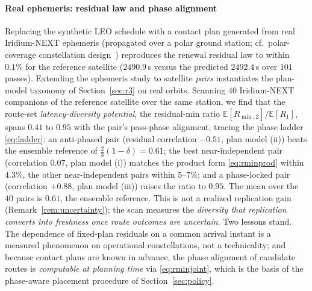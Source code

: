 \documentclass[twocolumn,3p,times,procedia]{elsarticle}
\theoremstyle{plain}
\theoremstyle{remark}
\newcommand{\E}{\mathbb{E}}
\begin{document}
\paragraph*{Real ephemeris: residual law and phase alignment}
Replacing the synthetic LEO schedule with a contact plan generated from
real Iridium-NEXT ephemeris (propagated over a polar ground station;
cf.\ polar-coverage constellation design~\cite{ma2026igso}) reproduces
the renewal residual law to within $0.1\%$ for the reference satellite
($2490.9$\,s versus the predicted $2492.4$\,s over $101$ passes).
Extending the ephemeris study to satellite \emph{pairs} instantiates
the plan-model taxonomy of Section~\ref{sec:r3} on real orbits.
Scanning $40$ Iridium-NEXT companions of the reference satellite over
the same station, we find that the route-set \emph{latency-diversity
potential}, the residual-min ratio $\E[R_{\min,2}]/\E[R_1]$, spans
$0.41$ to $0.95$ with the pair's
pass-phase alignment, tracing the phase ladder \eqref{eq:ladder}: an
anti-phased pair (residual correlation $-0.51$, plan model (ii)) beats
the ensemble reference of $\tfrac23(1-\delta){=}0.61$; the best
near-independent pair (correlation $0.07$, plan model (i)) matches the
product form \eqref{eq:rminprod} within $4.3\%$, the other
near-independent pairs within $5$--$7\%$; and a phase-locked pair
(correlation $+0.88$, plan model (iii)) raises the ratio to $0.95$. The
mean over the $40$ pairs is $0.61$, the ensemble reference. This is not
a realized replication gain (Remark~\ref{rem:uncertainty}); the scan
measures the \emph{diversity that replication converts into freshness
once route outcomes are uncertain}. Two lessons stand. The dependence of
fixed-plan residuals on a common arrival instant is a measured
phenomenon on operational constellations, not a technicality; and
because contact plans are known in advance, the phase alignment of candidate routes is \emph{computable
at planning time} via \eqref{eq:rminjoint}, which is the basis of the
phase-aware placement procedure of Section~\ref{sec:policy}.
\end{document}
